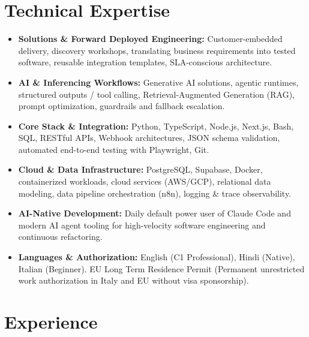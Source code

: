 \documentclass[10pt,a4paper]{article}
\begin{document}
\section{Technical Expertise}
\begin{itemize}
  \item \textbf{Solutions \& Forward Deployed Engineering:} Customer-embedded delivery, discovery workshops, translating business requirements into tested software, reusable integration templates, SLA-conscious architecture.
  \item \textbf{AI \& Inferencing Workflows:} Generative AI solutions, agentic runtimes, structured outputs / tool calling, Retrieval-Augmented Generation (RAG), prompt optimization, guardrails and fallback escalation.
  \item \textbf{Core Stack \& Integration:} Python, TypeScript, Node.js, Next.js, Bash, SQL, RESTful APIs, Webhook architectures, JSON schema validation, automated end-to-end testing with Playwright, Git.
  \item \textbf{Cloud \& Data Infrastructure:} PostgreSQL, Supabase, Docker, containerized workloads, cloud services (AWS/GCP), relational data modeling, data pipeline orchestration (n8n), logging \& trace observability.
  \item \textbf{AI-Native Development:} Daily default power user of Claude Code and modern AI agent tooling for high-velocity software engineering and continuous refactoring.
  \item \textbf{Languages \& Authorization:} English (C1 Professional), Hindi (Native), Italian (Beginner). EU Long Term Residence Permit (Permanent unrestricted work authorization in Italy and EU without visa sponsorship).
\end{itemize}

\section{Experience}
\end{document}
